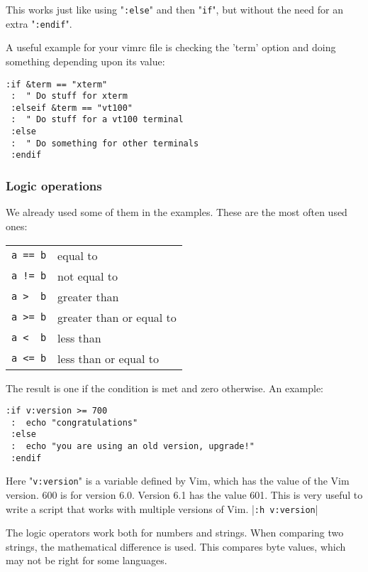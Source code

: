 This works just like using "\verb!:else!" and then "\verb!if!", but without the need for an extra "\verb!:endif!".

A useful example for your vimrc file is checking the 'term' option and doing something depending upon its value:

\begin{Verbatim}[samepage=true]
 :if &term == "xterm"
 :  " Do stuff for xterm
 :elseif &term == "vt100"
 :  " Do stuff for a vt100 terminal
 :else
 :  " Do something for other terminals
 :endif
\end{Verbatim}

\subsubsection{Logic operations}
We already used some of them in the examples.
These are the most often used ones:

\begin{center} \begin{tabular}{c l}
				\verb;a == b; & equal to \\
				\verb;a != b; & not equal to \\
				\verb;a >  b; & greater than \\
				\verb;a >= b; & greater than or equal to \\
				\verb;a <  b; & less than \\
				\verb;a <= b; & less than or equal to \\
\end{tabular} \end{center}

The result is one if the condition is met and zero otherwise.  An example:

\begin{Verbatim}[samepage=true]
 :if v:version >= 700
 :  echo "congratulations"
 :else
 :  echo "you are using an old version, upgrade!"
 :endif
\end{Verbatim}

Here "\verb!v:version!" is a variable defined by Vim, which has the value of the Vim version.
600 is for version 6.0.
Version 6.1 has the value 601.
This is very useful to write a script that works with multiple versions of Vim.
|\verb!:h v:version!|

The logic operators work both for numbers and strings.
When comparing two strings, the mathematical difference is used.
This compares byte values, which may not be right for some languages.

